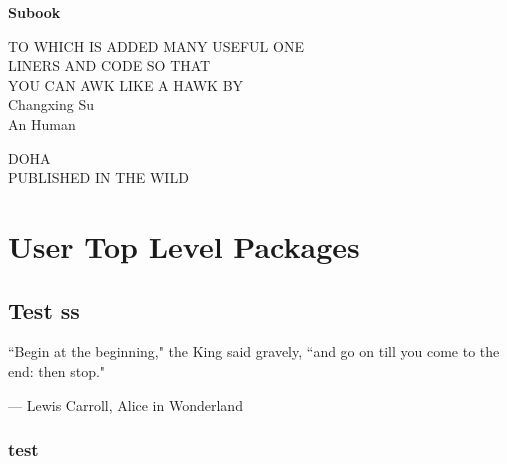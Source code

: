 \documentclass[]{subook}
\begin{document}
\pagestyle{empty}
\setcounter{page}{0}



\begin{center}
\bfseries
\nbvspace[1]
\Huge
{\nbtitlestretch\huge
Subook}

\nbvspace[1]
\normalsize

TO WHICH IS ADDED MANY USEFUL ONE\\
LINERS AND CODE SO THAT\\
YOU CAN AWK LIKE A HAWK
\nbvspace[1]
\small BY\\
\Large Changxing Su\\[0.5em]
\footnotesize An Human 

\nbvspace[2]

\nbvspace[3]
\normalsize

DOHA\\
\large
PUBLISHED IN THE WILD
\nbvspace[1]
\end{center}

\dominitoc%
\newpage

\tableofcontents %

\restoregeometry

\pagestyle{fancy} %
\part{User Top Level Packages}
   
\chapter{Test ss}
 
    \epigraph{``Begin at the beginning," the King said gravely, ``and go on till you come to the end: then stop."}{--- \textup{Lewis Carroll}, Alice in Wonderland}
    \minitoc
    \section{test}
\end{document}

